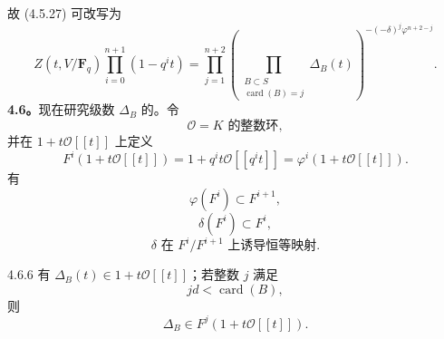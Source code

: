 故 (4.5.27) 可改写为
\[
Z(t,V/\mathbf F_q)\prod_{i=0}^{n+1}(1-q^it)
=\prod_{j=1}^{n+2}\left(\prod_{\substack{B\subset S\\\operatorname{card}(B)=j}}\Delta_B(t)\right)^{-(-\delta)^j\varphi^{n+2-j}}.\tag{4.5.23}
\]
\textbf{4.6。}现在研究级数 $\Delta_B$ 的。令
\[
\mathscr O=K\text{ 的整数环},\tag{4.6.1}
\]
并在 $1+t\mathscr O[[t]]$ 上定义
\[
F^i(1+t\mathscr O[[t]])=1+q^it\mathscr O[[q^it]]
=\varphi^i(1+t\mathscr O[[t]]).\tag{4.6.2}
\]
有
\[
\varphi(F^i)\subset F^{i+1},\tag{4.6.3}
\]
\[
\delta(F^i)\subset F^i,\tag{4.6.4}
\]
\[
\delta\text{ 在 }F^i/F^{i+1}\text{ 上诱导恒等映射}.\tag{4.6.5}
\]
\begin{SGAresult}{}{4.6.6}
有 $\Delta_B(t)\in1+t\mathscr O[[t]]$；若整数 $j$ 满足
\[
jd<\operatorname{card}(B),\tag{4.6.7}
\]
则
\[
\Delta_B\in F^j(1+t\mathscr O[[t]]).\tag{4.6.8}
\]
\end{SGAresult}
